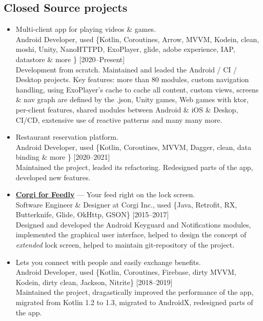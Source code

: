 \documentclass[a4paper]{article}
\begin{document}
	\subsection*{Closed Source projects}
	\begin{itemize}
		\item \faAndroid \faLinux \enskip Multi-client app for playing videos \& games. \\[0.2em]
		{\footnotesize Android Developer, used \{Kotlin, Coroutines, Arrow, MVVM, Kodein, clean, moshi, Unity, NanoHTTPD, ExoPlayer, glide, adobe experience, IAP, datastore \& more \} \hfill [2020--Present]} \\[0.2em]
		Development from scratch. Maintained and leaded the Android / CI / Desktop projects. Key features: more than 80 modules, custom navigation handling, using ExoPlayer's cache to cache all content, custom views, screens \& nav graph are defined by the .json, Unity games, Web games with ktor, per-client features, shared modules between Android \& iOS \& Deskop, CI/CD, exstensive use of reactive patterns and many many more. 
		
		\item \faAndroid \enskip Restaurant reservation platform. \\[0.2em]
		{\footnotesize Android Developer, used \{Kotlin, Coroutines, MVVM, Dagger, clean, data binding \& more \} \hfill [2020--2021]} \\[0.2em]
		Maintained the project, leaded its refactoring. Redesigned parts of the app, developed new features.
		
		\item \faAndroid \enskip \href{http://getcorgi.com/}{\textbf{Corgi for Feedly}} --- Your feed right on the lock screen. \\[0.2em]
		{\footnotesize Software Engineer \& Designer at Corgi Inc., used \{Java, Retrofit, RX, Butterknife, Glide, OkHttp, GSON\} \hfill [2015--2017]} \\[0.2em]
		Designed and developed the Android Keyguard and Notifications modules, implemented the graphical user interface, helped to design the concept of \textit{extended} lock screen, helped to maintain git-repository of the project.
		
		\item \faAndroid \enskip Lets you connect with people and easily exchange benefits. \\[0.2em]
		{\footnotesize Android Developer, used \{Kotlin, Coroutines, Firebase, dirty MVVM, Kodein, dirty clean, Jackson, Nitrite\} \hfill [2018--2019]} \\[0.2em]
		Maintained the project, dragastically improved the performance of the app, migrated from Kotlin 1.2 to 1.3, migrated to AndroidX, redesigned parts of the app.
		

\end{itemize}
\end{document}
